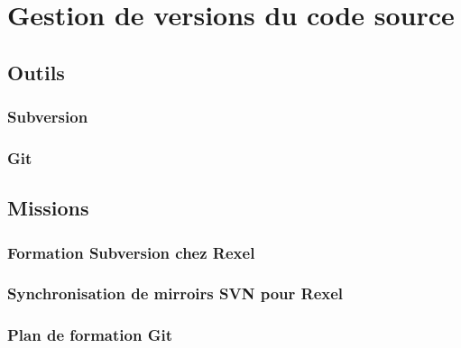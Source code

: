 \section{Gestion de versions du code source}

\subsection{Outils}

\subsubsection{Subversion}

\subsubsection{Git}

\subsection{Missions}

\subsubsection{Formation Subversion chez Rexel}

\subsubsection{Synchronisation de mirroirs SVN pour Rexel}

\subsubsection{Plan de formation Git}

